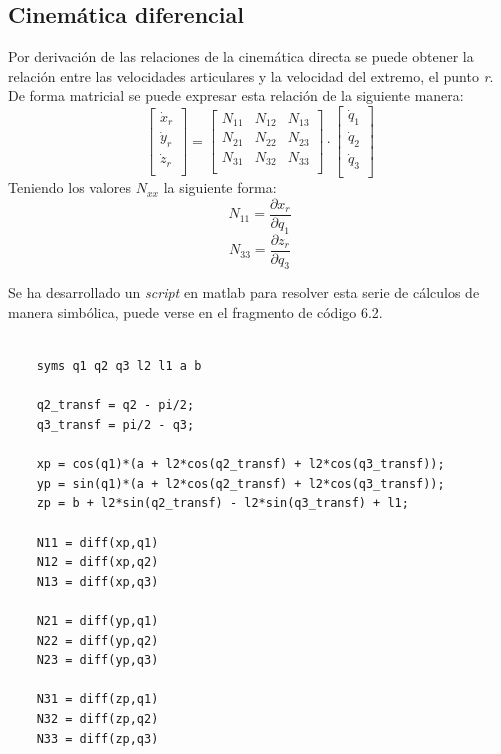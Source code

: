 \subsection{Cinemática diferencial}
	 Por derivación de las relaciones de la cinemática directa se puede obtener la relación entre las velocidades articulares y la velocidad del extremo, el punto \textit{r}. De forma matricial se puede expresar esta relación de la siguiente manera:
	\begin{equation}
		\label{cdif:eq0}
		\left[ \begin{array}{c}
			\dot x_r \\
			\dot y_r \\
			\dot z_r \\
		\end{array}\right]
		=
		\left[ \begin{array}{ccc}
		N_{11} & N_{12} & N_{13} \\
		N_{21} & N_{22} & N_{23} \\
		N_{31} & N_{32} & N_{33} \\
		\end{array}\right]
		\cdot
		\left[ \begin{array}{c}
		\dot q_1 \\
		\dot q_2 \\
		\dot q_3 \\
		\end{array}\right]
	\end{equation}
	Teniendo los valores $N_{xx}$ la siguiente forma:
	 \begin{equation}
	 \label{cdif:eq1}
	 N_{11} = \frac{\partial x_r}{\partial q_1}
	 \end{equation}
 	 \begin{equation}
 	 \label{cdif:eq2}
 	 N_{33} = \frac{\partial z_r}{\partial q_3}
 	 \end{equation}
 	 
	Se ha desarrollado un \textit{script} en matlab para resolver esta serie de cálculos de manera simbólica, puede verse en el fragmento de código 6.2.
	
		 \lstset{language=matlab, breaklines=true, basicstyle=\footnotesize}
		 \begin{lstlisting}[frame=single, caption=Cálculo cinemática diferencial, label=code:diferencialmatlab]
	%Cinematica diferencial
	
	syms q1 q2 q3 l2 l1 a b
	
	q2_transf = q2 - pi/2;
	q3_transf = pi/2 - q3;
	
	xp = cos(q1)*(a + l2*cos(q2_transf) + l2*cos(q3_transf));
	yp = sin(q1)*(a + l2*cos(q2_transf) + l2*cos(q3_transf));
	zp = b + l2*sin(q2_transf) - l2*sin(q3_transf) + l1;
	
	N11 = diff(xp,q1)
	N12 = diff(xp,q2)
	N13 = diff(xp,q3)
	
	N21 = diff(yp,q1)
	N22 = diff(yp,q2)
	N23 = diff(yp,q3)
	
	N31 = diff(zp,q1)
	N32 = diff(zp,q2)
	N33 = diff(zp,q3)
		 \end{lstlisting}
		 
